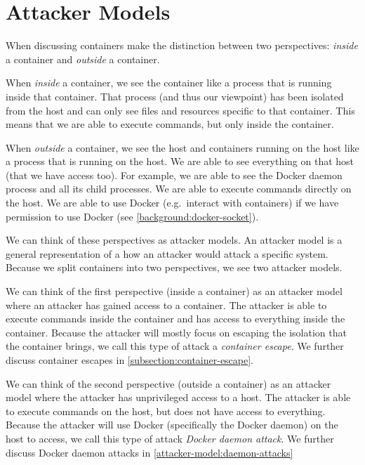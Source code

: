 \chapter{Attacker Models}\label{chapter:attack-surface-models}
When discussing containers make the distinction between two perspectives: \emph{inside} a container and \emph{outside} a container.

When \emph{inside} a container, we see the container like a process that is running inside that container. That process (and thus our viewpoint) has been isolated from the host and can only see files and resources specific to that container. This means that we are able to execute commands, but only inside the container.

When \emph{outside} a container, we see the host and containers running on the host like a process that is running on the host. We are able to see everything on that host (that we have access too). For example, we are able to see the Docker daemon process and all its child processes. We are able to execute commands directly on the host. We are able to use Docker (e.g.\ interact with containers) if we have permission to use Docker (see \autoref{background:docker-socket}).

\medskip

We can think of these perspectives as attacker models. An attacker model is a general representation of a how an attacker would attack a specific system. Because we split containers into two perspectives, we see two attacker models.

We can think of the first perspective (inside a container) as an attacker model where an attacker has gained access to a container. The attacker is able to execute commands inside the container and has access to everything inside the container. Because the attacker will mostly focus on escaping the isolation that the container brings, we call this type of attack a \emph{container escape}. We further discuss container escapes in \autoref{subsection:container-escape}.

We can think of the second perspective (outside a container) as an attacker model where the attacker has unprivileged access to a host. The attacker is able to execute commands on the host, but does not have access to everything. Because the attacker will use Docker (specifically the Docker daemon) on the host to access, we call this type of attack \emph{Docker daemon attack}. We further discuss Docker daemon attacks in \autoref{attacker-model:daemon-attacks}

